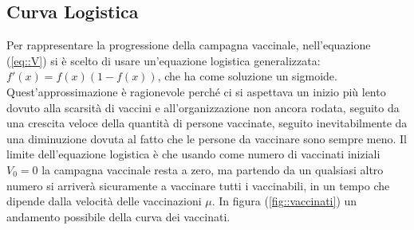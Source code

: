 \documentclass{article}
\begin{document}
\subsection{Curva Logistica}
Per rappresentare la progressione della campagna vaccinale, 
nell'equazione (\ref{eq::V}) si è scelto di usare un'equazione 
logistica generalizzata: $f'(x)=f(x)(1-f(x))$,
che ha come soluzione un sigmoide. Quest'approssimazione è 
ragionevole perché ci si aspettava un inizio più lento dovuto alla 
scarsità di vaccini e all'organizzazione non ancora rodata, 
seguito da una crescita veloce della quantità di persone vaccinate, 
seguito inevitabilmente da una diminuzione dovuta al fatto che le 
persone da vaccinare sono sempre meno. 
Il limite dell'equazione logistica è che usando come numero di 
vaccinati iniziali $V_0  = 0$ la campagna vaccinale resta a zero, 
ma partendo da un qualsiasi altro numero si arriverà sicuramente a 
vaccinare tutti i vaccinabili, in un tempo che dipende dalla velocità 
delle vaccinazioni $\mu$. In figura (\ref{fig::vaccinati}) un 
andamento possibile della curva dei vaccinati.\\
\end{document}
